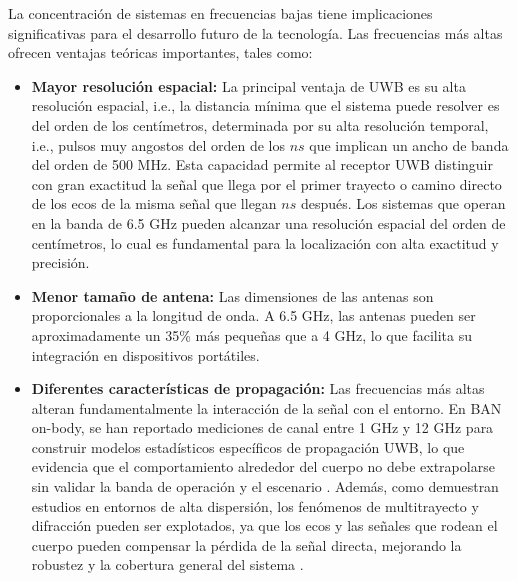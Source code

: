 La concentración de sistemas en frecuencias bajas tiene implicaciones significativas para el desarrollo futuro de la tecnología. Las frecuencias más altas ofrecen ventajas teóricas importantes, tales como:
%
\begin{itemize}
    \item \textbf{Mayor resolución espacial:} La principal ventaja de UWB es su alta resolución espacial, i.e., la distancia mínima que el sistema puede resolver es del orden de los centímetros, determinada por su alta resolución temporal, i.e., pulsos muy angostos del orden de los $ns$ que implican un ancho de banda del orden de 500 MHz. Esta capacidad permite al receptor UWB distinguir con gran exactitud la señal que llega por el primer trayecto o camino directo de los ecos de la misma señal que llegan $ns$ después. Los sistemas que operan en la banda de 6.5 GHz pueden alcanzar una resolución espacial del orden de centímetros, lo cual es fundamental para la localización con alta exactitud y precisión.    
    
    \item \textbf{Menor tamaño de antena:} Las dimensiones de las antenas son proporcionales a la longitud de onda. A 6.5 GHz, las antenas pueden ser aproximadamente un 35\% más pequeñas que a 4 GHz, lo que facilita su integración en dispositivos portátiles.
    
    \item \textbf{Diferentes características de propagación:} Las frecuencias más altas alteran fundamentalmente la interacción de la señal con el entorno. En BAN on-body, se han reportado mediciones de canal entre 1 GHz y 12 GHz para construir modelos estadísticos específicos de propagación UWB, lo que evidencia que el comportamiento alrededor del cuerpo no debe extrapolarse sin validar la banda de operación y el escenario \cite{ref19}. Además, como demuestran estudios en entornos de alta dispersión, los fenómenos de multitrayecto y difracción pueden ser explotados, ya que los ecos y las señales que rodean el cuerpo pueden compensar la pérdida de la señal directa, mejorando la robustez y la cobertura general del sistema \cite{ref15, ref18}.
\end{itemize}

